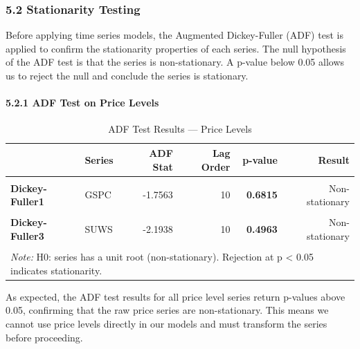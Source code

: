 \documentclass[
]{article}
\begin{document}
\subsubsection{5.2 Stationarity Testing}\label{stationarity-testing}

Before applying time series models, the Augmented Dickey-Fuller (ADF)
test is applied to confirm the stationarity properties of each series.
The null hypothesis of the ADF test is that the series is
non-stationary. A p-value below 0.05 allows us to reject the null and
conclude the series is stationary.

\paragraph{5.2.1 ADF Test on Price
Levels}\label{adf-test-on-price-levels}

\begingroup\fontsize{10}{12}\selectfont

\begin{longtable}[t]{>{}llrr>{}rr}
\caption{\label{tab:stationarity-levels}ADF Test Results — Price Levels}\\
\toprule
 & Series & ADF Stat & Lag Order & p-value & Result\\
\midrule
\textbf{\cellcolor{gray!10}{Dickey-Fuller}} & \cellcolor{gray!10}{ESGU} & \cellcolor{gray!10}{-1.6063} & \cellcolor{gray!10}{10} & \textbf{\cellcolor{gray!10}{0.7450}} & \cellcolor{gray!10}{Non-stationary}\\
\textbf{Dickey-Fuller1} & GSPC & -1.7563 & 10 & \textbf{0.6815} & Non-stationary\\
\textbf{\cellcolor{gray!10}{Dickey-Fuller2}} & \cellcolor{gray!10}{IWDA} & \cellcolor{gray!10}{-2.2830} & \cellcolor{gray!10}{10} & \textbf{\cellcolor{gray!10}{0.4585}} & \cellcolor{gray!10}{Non-stationary}\\
\textbf{Dickey-Fuller3} & SUWS & -2.1938 & 10 & \textbf{0.4963} & Non-stationary\\
\textbf{\cellcolor{gray!10}{Dickey-Fuller4}} & \cellcolor{gray!10}{Rate\_10Y} & \cellcolor{gray!10}{-3.1391} & \cellcolor{gray!10}{10} & \textbf{\cellcolor{gray!10}{0.0984}} & \cellcolor{gray!10}{Non-stationary}\\
\bottomrule
\multicolumn{6}{l}{\rule{0pt}{1em}\textit{Note: } H0: series has a unit root (non-stationary). Rejection at p < 0.05 indicates stationarity.}\\
\end{longtable}
\endgroup{}

As expected, the ADF test results for all price level series return
p-values above 0.05, confirming that the raw price series are
non-stationary. This means we cannot use price levels directly in our
models and must transform the series before proceeding.
\end{document}
